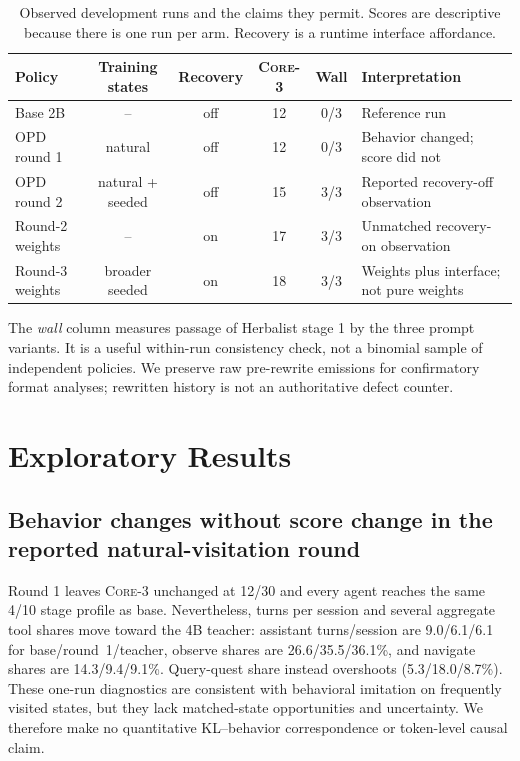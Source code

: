 \documentclass[11pt,a4paper]{article}
\newcommand{\core}{\textsc{Core-3}}
\begin{document}
\begin{table}[t]
\caption{Observed development runs and the claims they permit. Scores are
descriptive because there is one run per arm. Recovery is a runtime interface
affordance.}
\label{tab:arms}
\centering
\small
\setlength{\tabcolsep}{5pt}
\begin{tabular}{lccccl}
\toprule
Policy & Training states & Recovery & \core{} & Wall & Interpretation \\
\midrule
Base 2B & -- & off & 12 & 0/3 & Reference run \\
OPD round 1 & natural & off & 12 & 0/3 & Behavior changed; score did not \\
OPD round 2 & natural + seeded & off & 15 & 3/3 & Reported recovery-off observation \\
Round-2 weights & -- & on & 17 & 3/3 & Unmatched recovery-on observation \\
Round-3 weights & broader seeded & on & 18 & 3/3 & Weights plus interface; not pure weights \\
\bottomrule
\end{tabular}
\end{table}

The \emph{wall} column measures passage of Herbalist stage 1 by the three prompt
variants. It is a useful within-run consistency check, not a binomial sample of
independent policies. We preserve raw pre-rewrite emissions for confirmatory
format analyses; rewritten history is not an authoritative defect counter.

\section{Exploratory Results}

\subsection{Behavior changes without score change in the reported
natural-visitation round}

Round 1 leaves \core{} unchanged at 12/30 and every agent reaches the same 4/10
stage profile as base. Nevertheless, turns per session and several aggregate
tool shares move toward the 4B teacher: assistant turns/session are
9.0/6.1/6.1 for base/round~1/teacher, observe shares are
26.6/35.5/36.1\%, and navigate shares are 14.3/9.4/9.1\%. Query-quest share
instead overshoots (5.3/18.0/8.7\%). These one-run diagnostics are consistent
with behavioral imitation on frequently visited states, but they lack
matched-state opportunities and uncertainty. We therefore make no quantitative
KL--behavior correspondence or token-level causal claim.
\end{document}

